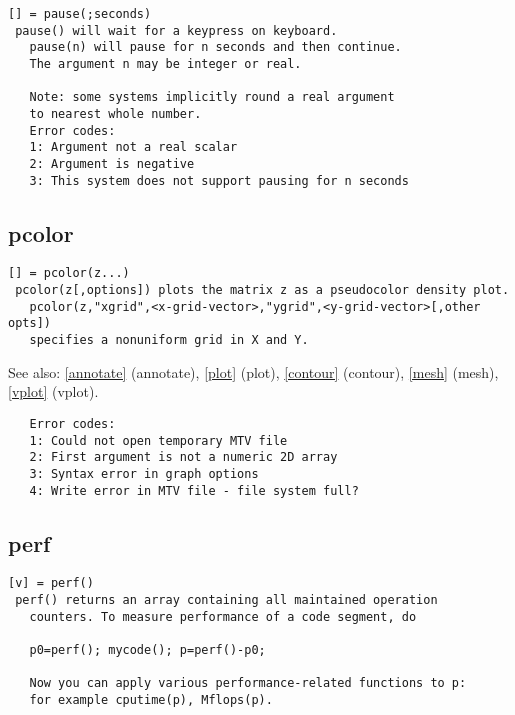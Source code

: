 \documentclass[a4paper]{article}
\begin{document}
\begin{tscreen}
\begin{verbatim}
[] = pause(;seconds)
 pause() will wait for a keypress on keyboard.
   pause(n) will pause for n seconds and then continue.
   The argument n may be integer or real.

   Note: some systems implicitly round a real argument
   to nearest whole number.
   Error codes:
   1: Argument not a real scalar
   2: Argument is negative
   3: This system does not support pausing for n seconds 
\end{verbatim}
\end{tscreen}





\subsection{pcolor\label{pcolor}}

\begin{tscreen}
\begin{verbatim}
[] = pcolor(z...)
 pcolor(z[,options]) plots the matrix z as a pseudocolor density plot.
   pcolor(z,"xgrid",<x-grid-vector>,"ygrid",<y-grid-vector>[,other opts])
   specifies a nonuniform grid in X and Y.
\end{verbatim}

See also: \ref{annotate} {(annotate)}, \ref{plot} {(plot)}, \ref{contour} {(contour)}, \ref{mesh} {(mesh)}, \ref{vplot} {(vplot)}.
\begin{verbatim}
   Error codes:
   1: Could not open temporary MTV file
   2: First argument is not a numeric 2D array
   3: Syntax error in graph options
   4: Write error in MTV file - file system full? 
\end{verbatim}
\end{tscreen}





\subsection{perf\label{perf}}

\begin{tscreen}
\begin{verbatim}
[v] = perf()
 perf() returns an array containing all maintained operation
   counters. To measure performance of a code segment, do

   p0=perf(); mycode(); p=perf()-p0;

   Now you can apply various performance-related functions to p:
   for example cputime(p), Mflops(p). 
\end{verbatim}
\end{tscreen}
\end{document}
